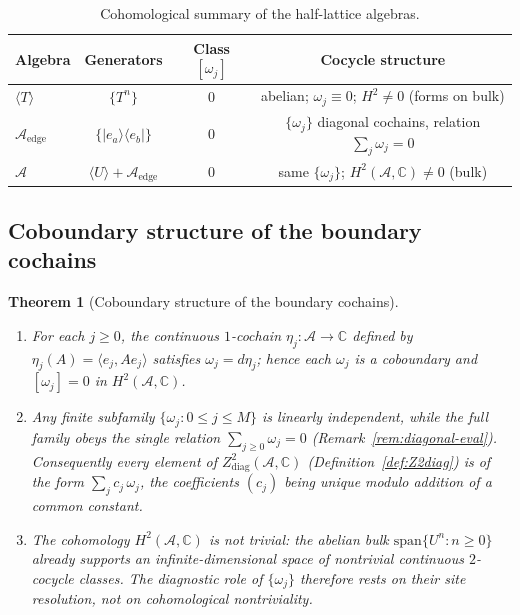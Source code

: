 \documentclass[10pt]{amsart}
\newcommand{\1}{{\mathbb{I}}}
\newtheorem{theorem}{Theorem}[section]
\numberwithin{equation}{section}
\begin{document}
\begin{table}[hbpt]
\centering
\caption{Cohomological summary of the half-lattice algebras.}
\label{tab:algebra-summary}
\begin{tabular}{@{}lccc@{}}
\toprule
Algebra & Generators & Class $[\omega_j]$ & Cocycle structure \\
\midrule
$\langle T \rangle$ & $\{T^n\}$ & $0$ & abelian; $\omega_j \equiv 0$; $H^2\ne0$ (forms on bulk) \\
$\mathcal{A}_{\mathrm{edge}}$ & $\{|e_a\rangle\langle e_b|\}$ & $0$ &
  $\{\omega_j\}$ diagonal cochains, relation $\sum_j\omega_j=0$ \\
$\mathcal{A}$ & $\langle U\rangle + \mathcal{A}_{\mathrm{edge}}$ & $0$ &
  same $\{\omega_j\}$; $H^2(\mathcal{A},\mathbb{C})\ne0$ (bulk) \\
\bottomrule
\end{tabular}
\end{table}

\subsection{Coboundary structure of the boundary cochains}

\begin{theorem}[Coboundary structure of the boundary cochains]\label{thm:H2-vanishes}
\begin{enumerate}
\item For each $j \ge 0$, the continuous $1$-cochain $\eta_j : \mathcal{A} \to \mathbb{C}$
defined by $\eta_j(A) = \langle e_j, Ae_j\rangle$ satisfies $\omega_j = d\eta_j$; hence each
$\omega_j$ is a coboundary and $[\omega_j] = 0$ in $H^2(\mathcal{A},\mathbb{C})$.
\item Any finite subfamily $\{\omega_j : 0 \le j \le M\}$ is linearly independent, while the
full family obeys the single relation $\sum_{j\ge0}\omega_j = 0$
(Remark~\ref{rem:diagonal-eval}). Consequently every element of
$Z^2_{\mathrm{diag}}(\mathcal{A},\mathbb{C})$ (Definition~\ref{def:Z2diag}) is of the form
$\sum_{j}c_j\,\omega_j$, the coefficients $(c_j)$ being unique modulo addition of a common
constant.
\item The cohomology $H^2(\mathcal{A},\mathbb{C})$ is \emph{not} trivial: the abelian bulk
$\mathrm{span}\{U^n:n\ge0\}$ already supports an infinite-dimensional space of nontrivial
\emph{continuous} $2$-cocycle classes. The diagnostic role of $\{\omega_j\}$ therefore rests on
their site resolution, not on cohomological nontriviality.
\end{enumerate}
\end{theorem}
\end{document}
